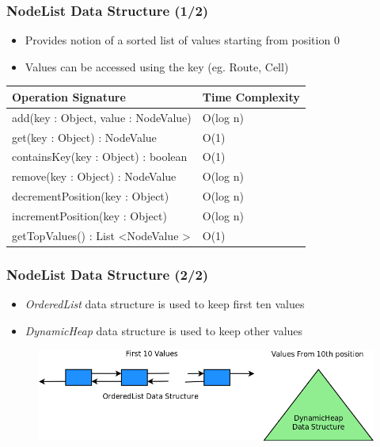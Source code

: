 \documentclass{beamer}
\begin{document}
\begin{frame}
\frametitle{NodeList Data Structure (1/2)}

\begin{itemize}
        \item Provides notion of a sorted list of values starting from position 0
        \item Values can be accessed using the key (eg. Route, Cell)
\end{itemize}

\begin{table}
\centering
\begin{tabular}{|l|l|} \hline
Operation Signature & Time Complexity \\ \hline \hline
add(key : Object, value : NodeValue) & O(log n) \\ \hline
get(key : Object) : NodeValue & O(1) \\ \hline
containsKey(key : Object) : boolean & O(1) \\ \hline
remove(key : Object) : NodeValue & O(log n) \\ \hline
decrementPosition(key : Object) & O(log n) \\ \hline
incrementPosition(key : Object) & O(log n) \\ \hline
getTopValues() : List \textless NodeValue \textgreater & O(1) \\ \hline
\end{tabular}
\end{table}

\end{frame}

\begin{frame}
\frametitle{NodeList Data Structure (2/2)}

\begin{itemize}
        \item \textit{OrderedList} data structure is used to keep first ten values
        \item \textit{DynamicHeap} data structure is used to keep other values
\end{itemize}

\begin{figure}
        \includegraphics[width=0.8\linewidth]{nodeliststruct.png}
\end{figure}

\end{frame}
\end{document}
